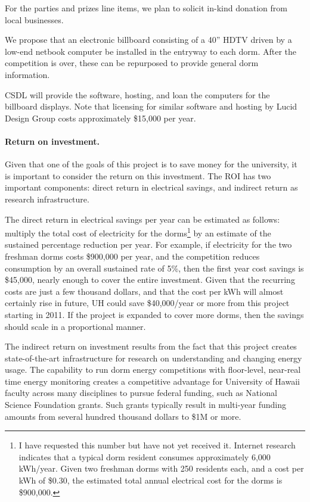 \documentclass[11pt]{article}
\begin{document}
For the parties and prizes line items, we plan to solicit in-kind donation from
local businesses.

We propose that an electronic  billboard consisting of a 40'' HDTV driven by a
low-end netbook computer be installed in the entryway to each dorm.  After the 
competition is over, these can be repurposed to provide general dorm information. 

CSDL will provide the software, hosting, and loan the computers for the
billboard displays.  Note that licensing for similar software and hosting by
Lucid Design Group costs approximately \$15,000 per year.

\paragraph{Return on investment.}  Given that one of the goals of this
project is to save money for the university, it is important to consider
the return on this investment.  The ROI has two important components:
direct return in electrical savings, and indirect return as research
infrastructure.

The direct return in electrical savings per year can be estimated as
follows: multiply the total cost of electricity for the dorms\footnote{I
  have requested this number but have not yet received it. Internet
  research indicates that a typical dorm resident consumes approximately
  6,000 kWh/year. Given two freshman dorms with 250 residents each, and a
  cost per kWh of \$0.30, the estimated total annual electrical cost for the dorms
  is \$900,000.} by an estimate of the sustained percentage reduction per
year.  For example, if electricity for the two freshman dorms costs
\$900,000 per year, and the competition reduces consumption by an overall
sustained rate of 5\%, then the first year cost savings is \$45,000, nearly
enough to cover the entire investment.  Given that the recurring costs are
just a few thousand dollars, and that the cost per kWh will almost
certainly rise in future, UH could save \$40,000/year or more from this
project starting in 2011.  If the project is expanded to cover more dorms,
then the savings should scale in a proportional manner.

The indirect return on investment results from the fact that this project
creates state-of-the-art infrastructure for research on understanding and
changing energy usage.  The capability to run dorm energy competitions with
floor-level, near-real time energy monitoring creates a competitive
advantage for University of Hawaii faculty across many disciplines to
pursue federal funding, such as National Science Foundation grants.  Such
grants typically result in multi-year funding amounts from several hundred
thousand dollars to \$1M or more.
\end{document}
